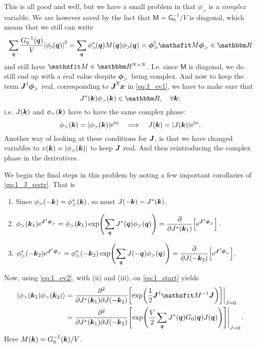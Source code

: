 \documentclass[11pt,letter, swedish, english
]{article}
\begin{document}
This is all good and well, but we have a small problem in that
$\phi_>$ is a \emph{complex} variable. We are however saved by the
fact that $\mathsf{M} = \mathsf{G}_0^{-1}/V$ is diagonal, which means
that we still can write
\begin{equation}
\sum_{\vb*q} \frac{G_0^{-1}(\vb*q)}{V}\qty|\phi_{\!>}\!(\vb*q)|^2
=\sum_{\vb*q} \phi_{>}^*\!(\vb*q)M(\vb*q)\phi_{>}\!(\vb*q) 
= \vb*\phi_{>}^\dagger\mathsf{M}\vb*\phi_{>}\in\R
\end{equation}
and still have $\mathsf{M}\in\R^{N\times N}$. I.e. since $\mathsf{M}$
is diagonal, we do still end up with a real value despite $\vb*\phi_>$
being complex. And now to keep the term $\vb*J^\dagger\vb*\phi_>$ real,
corresponding to $\vb*J^\mathsfrm{T}\vb*x$ in \eqref{eq:1_ev1}, 
we have to make sure that
\begin{equation}
J^*(\vb*k)\phi_>(\vb*k)\in\R, \quad\forall\vb*k;
\end{equation}
i.e. $J(\vb*k)$ and $\phi_>(\vb*k)$ have to have the same complex phase:
\begin{equation}\label{eq:1_J_restr}
\phi_>(\vb*k) = |\phi_>(\vb*k)|\mathrm{e}^{\mathrm{i}\alpha}
\quad\Longrightarrow\quad
J(\vb*k) = |J(\vb*k)|\mathrm{e}^{\mathrm{i}\alpha}.
\end{equation}
Another way of looking at these conditions for $\vb*J$, is that we have
changed variables to $x(\vb*k)=|\phi_>(\vb*k)|$ to keep $\vb*J$
real. And then reintroducing the complex phase in the derivatives.

We begin the final steps in this problem by noting a few important
corollaries of \eqref{eq:1_J_restr}. That is
\begin{enumerate}[label=(\roman*)]
\item Since $\phi_>(-\vb*k)=\phi_>^*(\vb*k)$, so must
$J(-\vb*k)=J^*(\vb*k)$.
\item $\displaystyle \phi_>(\vb*k_1) \mathrm{e}^{\vb*J^\dagger\vb*\phi_>}
=\phi_>(\vb*k_1) \exp(\sum_{\vb*q}J^*(\vb*q)\phi_>(\vb*q))
=\pdv{J^*(\vb*k_1)}\qty[\mathrm{e}^{\vb*J^\dagger\vb*\phi_>}]$.
\item $\displaystyle \phi_>^*(-\vb*k_2) \mathrm{e}^{\vb*J^\dagger\vb*\phi_>}
=\phi_>^*(-\vb*k_2) \exp(\sum_{\vb*q}J(-\vb*q)\phi_>(\vb*q))
=\pdv{J(-\vb*k_2)}\qty[\mathrm{e}^{\vb*J^\dagger\vb*\phi_>}]$.
\end{enumerate}
Now, using \eqref{eq:1_ev2}, with (ii) and (iii), on
\eqref{eq:1_start} yields 
\begin{equation}
\begin{aligned}
\ev{\phi_>(\vb*k_1)\phi_>(\vb*k_2)} 
=& \eval{\pdv[2]{}{J^*(\vb*k_1)}{J(-\vb*k_2)}
\qty[\exp(\frac{1}{2}\vb*J^\dagger\mathsf{M}^{-1}\vb*J)]}_{J=0}\\
=&\eval{\pdv[2]{}{J^*(\vb*k_1)}{J(-\vb*k_2)}
\qty[\exp(\frac{V}{2}\sum_{\vb*q} J^*(\vb*q)G_0(\vb*q)J(\vb*q))]}_{J=0}.
\end{aligned}
\end{equation}
Here $M(\vb*k)=G_0^{-1}(\vb*k)/V$. 
\end{document}
